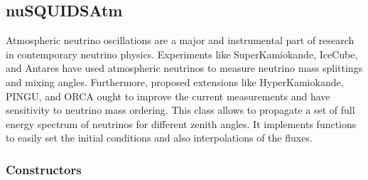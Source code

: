 \documentclass[3p,12pt]{elsarticle}
\begin{document}
\subsection{nuSQUIDSAtm\label{sec:nusquidsatm}}

Atmospheric neutrino oscillations are a major and instrumental part of
research in contemporary neutrino physics. Experiments like
SuperKamiokande, IceCube, and Antares have used atmospheric neutrinos
to measure neutrino mass splittings and mixing angles. Furthermore,
proposed extensions like HyperKamiokande, PINGU, and ORCA ought to
improve the current measurements and have sensitivity to 
neutrino mass ordering. This class allows to propagate a set of full
energy spectrum of neutrinos for different zenith angles.
It implements functions to easily set the initial conditions and also
interpolations of the fluxes.
\subsubsection{Constructors}
\end{document}
